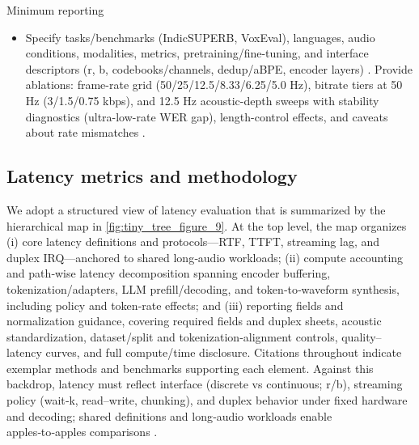 Minimum reporting
\begin{itemize}
  \item Specify tasks/benchmarks (IndicSUPERB, VoxEval), languages, audio conditions, modalities, metrics, pretraining/fine-tuning, and interface descriptors (r, b, codebooks/channels, dedup/aBPE, encoder layers) \cite{cui2025voxevalbenchmarkingknowledgeunderstandin,entry2025indicsuperbspeechprocessinguniversalperf,ji2025languagecodecbridgingdiscreterepresentat,zhang2025impactframeratesspeechtokenizercasestudy,huang2024repcodecspeechrepresentationcodectokeniz}. Provide ablations: frame-rate grid (50/25/12.5/8.33/6.25/5.0 Hz), bitrate tiers at 50 Hz (3/1.5/0.75 kbps), and 12.5 Hz acoustic-depth sweeps with stability diagnostics (ultra-low-rate WER gap), length-control effects, and caveats about rate mismatches \cite{poli2025fastabxlibraryefficientcomputationabxdis,vashishth2024stabspeechtokenizerassessmentbenchmark,maimon2025salmonsuiteacousticlanguagemodelevaluati,wang2025tadicodectextawarediffusionspeechtokeniz,hsu2024exploringcontextlearningtextlessspeechla,li2024investigatingneuralaudiocodecsspeechlang}.
\end{itemize}

\subsection{Latency metrics and methodology} \label{subsec:Latency metrics and methodology}
We adopt a structured view of latency evaluation that is summarized by the hierarchical map in \autoref{fig:tiny_tree_figure_9}. At the top level, the map organizes (i) core latency definitions and protocols—RTF, TTFT, streaming lag, and duplex IRQ—anchored to shared long‑audio workloads; (ii) compute accounting and path‑wise latency decomposition spanning encoder buffering, tokenization/adapters, LLM prefill/decoding, and token‑to‑waveform synthesis, including policy and token‑rate effects; and (iii) reporting fields and normalization guidance, covering required fields and duplex sheets, acoustic standardization, dataset/split and tokenization‑alignment controls, quality–latency curves, and full compute/time disclosure. Citations throughout indicate exemplar methods and benchmarks supporting each element. Against this backdrop, latency must reflect interface (discrete vs continuous; r/b), streaming policy (wait‑k, read–write, chunking), and duplex behavior under fixed hardware and decoding; shared definitions and long‑audio workloads enable apples‑to‑apples comparisons \cite{li2025televaldynamicbenchmarkdesignedspokenlan}.

